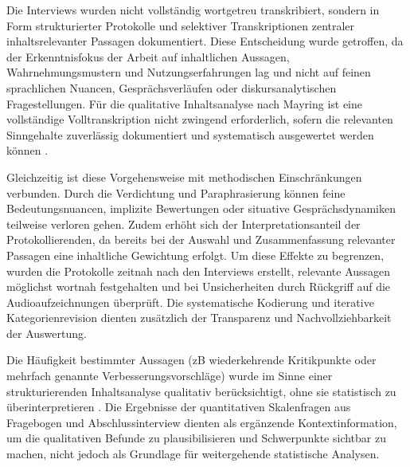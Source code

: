 Die Interviews wurden nicht vollständig wortgetreu transkribiert, sondern in Form strukturierter Protokolle und selektiver Transkriptionen zentraler inhaltsrelevanter Passagen dokumentiert. Diese Entscheidung wurde getroffen, da der Erkenntnisfokus der Arbeit auf inhaltlichen Aussagen, Wahrnehmungsmustern und Nutzungserfahrungen lag und nicht auf feinen sprachlichen Nuancen, Gesprächsverläufen oder diskursanalytischen Fragestellungen. Für die qualitative Inhaltsanalyse nach Mayring ist eine vollständige Volltranskription nicht zwingend erforderlich, sofern die relevanten Sinngehalte zuverlässig dokumentiert und systematisch ausgewertet werden können \cite{120:Mayring2014}.

Gleichzeitig ist diese Vorgehensweise mit methodischen Einschränkungen verbunden. Durch die Verdichtung und Paraphrasierung können feine Bedeutungsnuancen, implizite Bewertungen oder situative Gesprächsdynamiken teilweise verloren gehen. Zudem erhöht sich der Interpretationsanteil der Protokollierenden, da bereits bei der Auswahl und Zusammenfassung relevanter Passagen eine inhaltliche Gewichtung erfolgt. Um diese Effekte zu begrenzen, wurden die Protokolle zeitnah nach den Interviews erstellt, relevante Aussagen möglichst wortnah festgehalten und bei Unsicherheiten durch Rückgriff auf die Audioaufzeichnungen überprüft. Die systematische Kodierung und iterative Kategorienrevision dienten zusätzlich der Transparenz und Nachvollziehbarkeit der Auswertung.

Die Häufigkeit bestimmter Aussagen (\acrshort{zB} wiederkehrende Kritikpunkte oder mehrfach genannte Verbesserungsvorschläge) wurde im Sinne einer strukturierenden Inhaltsanalyse qualitativ berücksichtigt, ohne sie statistisch zu überinterpretieren \cite{120:Mayring2014}. Die Ergebnisse der quantitativen Skalenfragen aus Fragebogen und Abschlussinterview dienten als ergänzende Kontextinformation, um die qualitativen Befunde zu plausibilisieren und Schwerpunkte sichtbar zu machen, nicht jedoch als Grundlage für weitergehende statistische Analysen.
